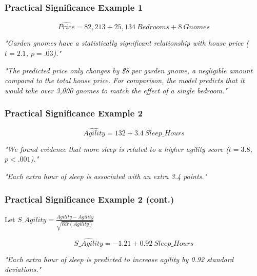 \documentclass[12pt, block=fill]{beamer}
\begin{document}
\begin{frame}
  \frametitle{Practical Significance Example 1}


$$\widehat{Price} = 82,213 + 25,134 \ Bedrooms + 8 \ Gnomes$$

\textit{"Garden gnomes have a statistically significant relationship
  with house price ($t=2.1$, $p = .03$)."}
\pause

\textit{"The predicted price only changes by \$8 per garden gnome, a
  negligible amount compared to the total house price.  For
  comparison, the model predicts that it would take over 3,000 gnomes
  to match the effect of a single bedroom."} 
\end{frame}



\begin{frame}
  \frametitle{Practical Significance Example 2}
  
  $$\widehat{Agility} = 132 + 3.4 \ Sleep\_Hours$$
  
  \textit{"We found evidence that more sleep is related to a higher
    agility score ($t=3.8$, $p < .001$)."} 
  
  \textit{"Each extra hour of sleep is associated with an extra 3.4 points."}
   
  
\end{frame}

\begin{frame}
  \frametitle{Practical Significance Example 2 (cont.)}
  Let $S\_Agility = \frac{Agility -
    \overline{Agility}}{\sqrt{\widehat{var}(Agility)}}$ 
  
  $$\widehat{S\_Agility} = -1.21 + 0.92 \  Sleep\_Hours$$
    
  \textit{"Each extra hour of sleep is predicted to increase agility
    by 0.92 standard deviations."} 
  

  
\end{frame}
\end{document}

